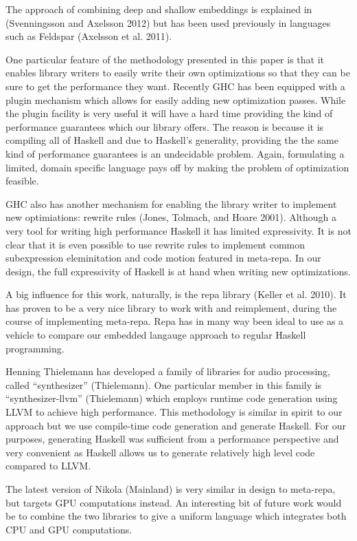 \documentclass[preprint]{sigplanconf}
\begin{document}
The approach of combining deep and shallow embeddings is explained in
(Svenningsson and Axelsson 2012) but has been used previously in
languages such as Feldspar (Axelsson et al. 2011).

One particular feature of the methodology presented in this paper is
that it enables library writers to easily write their own optimizations
so that they can be sure to get the performance they want. Recently GHC
has been equipped with a plugin mechanism which allows for easily adding
new optimization passes. While the plugin facility is very useful it
will have a hard time providing the kind of performance guarantees which
our library offers. The reason is because it is compiling all of Haskell
and due to Haskell's generality, providing the the same kind of
performance guarantees is an undecidable problem. Again, formulating a
limited, domain specific language pays off by making the problem of
optimization feasible.

GHC also has another mechanism for enabling the library writer to
implement new optimiations: rewrite rules (Jones, Tolmach, and Hoare
2001). Although a very tool for writing high performance Haskell it has
limited expressivity. It is not clear that it is even possible to use
rewrite rules to implement common subexpression eleminitation and code
motion featured in meta-repa. In our design, the full expressivity of
Haskell is at hand when writing new optimizations.

A big influence for this work, naturally, is the repa library (Keller et
al. 2010). It has proven to be a very nice library to work with and
reimplement, during the course of implementing meta-repa. Repa has in
many way been ideal to use as a vehicle to compare our embedded langauge
approach to regular Haskell programming.

Henning Thielemann has developed a family of libraries for audio
processing, called ``synthesizer'' (Thielemann). One particular member
in this family is ``synthesizer-llvm'' (Thielemann) which employs
runtime code generation using LLVM to achieve high performance. This
methodology is similar in spirit to our approach but we use compile-time
code generation and generate Haskell. For our purposes, generating
Haskell was sufficient from a performance perspective and very
convenient as Haskell allows us to generate relatively high level code
compared to LLVM.

The latest version of Nikola (Mainland) is very similar in design to
meta-repa, but targets GPU computations instead. An interesting bit of
future work would be to combine the two libraries to give a uniform
language which integrates both CPU and GPU computations.
\end{document}

